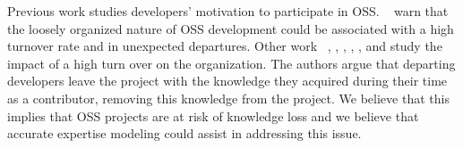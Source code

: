 Previous work studies developers' motivation to participate in \ac{OSS}. ~\citep{Wu-oss} warn that the loosely organized nature of OSS development could be associated with a high turnover rate and in unexpected departures. Other work ~\citep{Rigby}, \citep{Foucault}, \citep{Izquierdo-Cortazar}, \citep{Mockus:2010}, \citep{Torchiano:2011:MPT:1985374.1985379}, and \citep{Ricca:2011:DCT:2022348.2022383} study the impact of a high turn over on the organization. The authors argue that departing developers leave the project with the knowledge they acquired during their time as a contributor, removing this knowledge from the project. We believe that this implies that OSS projects are at risk of knowledge loss and we believe that accurate expertise modeling could assist in addressing this issue.





